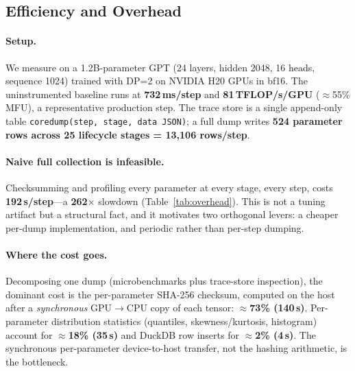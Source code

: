 
\subsection{Efficiency and Overhead}
\label{subsec:efficiency}

\paragraph{Setup.} We measure on a 1.2B-parameter GPT (24 layers, hidden 2048, 16 heads, sequence 1024) trained with DP=2 on NVIDIA H20 GPUs in bf16. The uninstrumented baseline runs at \textbf{732\,ms/step} and \textbf{81\,TFLOP/s/GPU} ($\approx$55\% MFU), a representative production step. The trace store is a single append-only table \texttt{coredump(step, stage, data\,JSON)}; a full dump writes \textbf{524 parameter rows across 25 lifecycle stages = 13{,}106 rows/step}.

\paragraph{Naive full collection is infeasible.} Checksumming and profiling every parameter at every stage, every step, costs \textbf{192\,s/step}---a \textbf{262$\times$} slowdown (Table~\ref{tab:overhead}). This is not a tuning artifact but a structural fact, and it motivates two orthogonal levers: a cheaper per-dump implementation, and periodic rather than per-step dumping.

\paragraph{Where the cost goes.} Decomposing one dump (microbenchmarks plus trace-store inspection), the dominant cost is the per-parameter SHA-256 checksum, computed on the host after a \emph{synchronous} GPU$\to$CPU copy of each tensor: \textbf{$\approx$73\% (140\,s)}. Per-parameter distribution statistics (quantiles, skewness/kurtosis, histogram) account for \textbf{$\approx$18\% (35\,s)} and DuckDB row inserts for \textbf{$\approx$2\% (4\,s)}. The synchronous per-parameter device-to-host transfer, not the hashing arithmetic, is the bottleneck.

